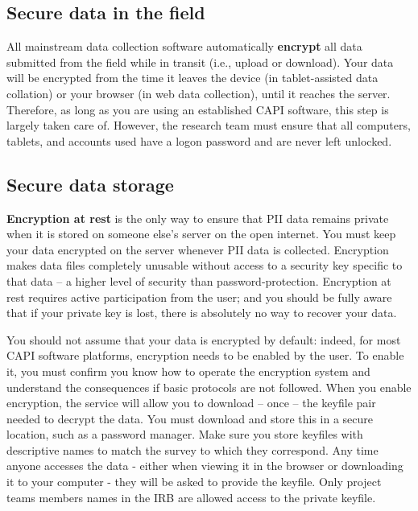 \subsection{Secure data in the field}
All mainstream data collection software automatically \textbf{encrypt}
all data submitted from the field while in transit (i.e., upload or download).  Your data will be encrypted from the time it leaves the device (in tablet-assisted data collation) or your browser (in web data collection), until it reaches the server. Therefore, as long as you are using an established CAPI software, this step is largely taken care of. However, the research team must ensure that all computers, tablets, and accounts used have a logon password and are never left unlocked.

\subsection{Secure data storage}
\textbf{Encryption at rest} is the only way to ensure that PII data remains private when it is stored on someone else's server on the open internet. You must keep your data encrypted on the server whenever PII data is collected.
Encryption makes data files completely unusable without access to a security key specific to that data -- a higher level of security than password-protection.
Encryption at rest requires active participation from the user; and you should be fully aware that if your private key is lost, there is absolutely no way to recover your data.

You should not assume that your data is encrypted by default: indeed, for most CAPI software platforms, encryption needs to be enabled by the user.
To enable it, you must confirm you know how to operate the encryption system and understand the consequences if basic protocols are not followed.
When you enable encryption, the service will allow you to download -- once -- the keyfile pair needed to decrypt the data.
You must download and store this in a secure location, such as a password manager. Make sure you store keyfiles with descriptive names to match the survey to which they correspond.
Any time anyone accesses the data - either when viewing it in the browser or downloading it to your computer - they will be asked to provide the keyfile.
Only project teams members names in the IRB are allowed access to the private keyfile.

